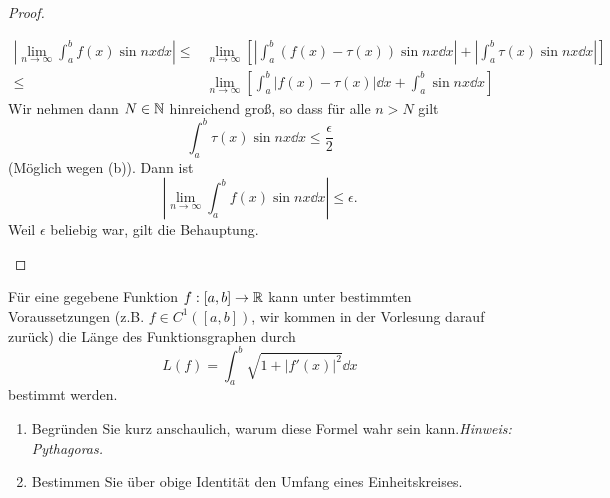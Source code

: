 \begin{proof}
\begin{enumerate}[label=(\roman*)]
\begin{align*}
				\left| \lim_{n \to \infty} \int_a^b f(x)\sin nx\dd{x} \right| \le& \lim_{n \to \infty} \left[ \left| \int_a^b (f(x)-\tau(x))\sin nx\dd{x} \right|+\left| \int_a^b \tau(x)\sin nx \dd{x} \right|   \right] \\
				\le& \lim_{n \to \infty} \left[ \int_a^b |f(x)-\tau(x)|\dd{x}+\int_a^b\sin nx\dd{x} \right]
			\end{align*}
			Wir nehmen dann $N\in \mathbb{N}$ hinreichend groß, so dass f\"{u}r alle $n>N$ gilt
			\[
				\int_a^b \tau(x)\sin nx\dd{x}\le \frac{\epsilon}{2}
			\]
			(Möglich wegen (b)). Dann ist
			\[
				\left| \lim_{n \to \infty} \int_a^b f(x)\sin nx\dd{x} \right| \le \epsilon
			.\] 
			Weil $\epsilon$ beliebig war, gilt die Behauptung.
	\end{enumerate}
\end{proof}
\begin{Problem}
	F\"{u}r eine gegebene Funktion $f:[a,b]\to \mathbb{R}$ kann unter bestimmten Voraussetzungen (z.B. $f\in C^1([a,b])$, wir kommen in der Vorlesung darauf zurück) die Länge des Funktionsgraphen durch
	\[
		L(f)=\int_a^b \sqrt{1+|f'(x)|^2} \dd{x}\] 
		bestimmt werden.
		\begin{enumerate}[label=(\roman*)]
			\item Begründen Sie kurz anschaulich, warum diese Formel wahr sein kann.\emph{Hinweis: Pythagoras.}
			\item Bestimmen Sie über obige Identität den Umfang eines Einheitskreises.
		\end{enumerate}
\end{Problem}
